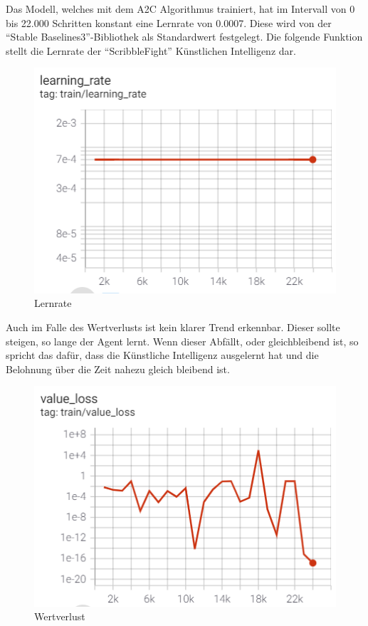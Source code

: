 Das Modell, welches mit dem A2C Algorithmus trainiert, hat im Intervall von 0 bis 22.000 Schritten
konstant eine Lernrate von 0.0007. Diese wird von der ``Stable Baselines3''-Bibliothek als Standardwert
festgelegt.
Die folgende Funktion stellt die Lernrate der ``ScribbleFight'' Künstlichen Intelligenz dar.

\begin{figure}[H]
  \centering
  \includegraphics[scale=0.7]{pics/Tensorboard/A2C/learning_rate.png}
  \caption{Lernrate}
  \label{fig:a2c:learningrate}
\end{figure}

Auch im Falle des Wertverlusts ist kein klarer Trend erkennbar.
Dieser sollte steigen, so lange der Agent lernt. Wenn dieser Abfällt, oder gleichbleibend ist,
so spricht das dafür, dass die Künstliche Intelligenz ausgelernt hat und die Belohnung über die Zeit
nahezu gleich bleibend ist.

\begin{figure}[H]
  \centering
  \includegraphics[scale=0.7]{pics/Tensorboard/A2C/value_loss_new.png}
  \caption{Wertverlust}
  \label{fig:a2c:valueLoss}
\end{figure}

